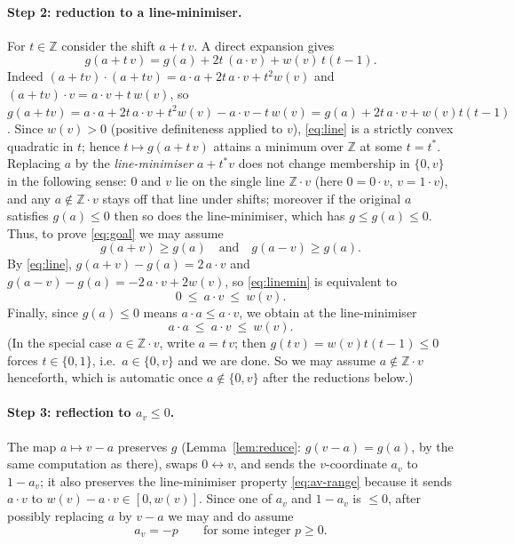 \documentclass[11pt]{article}
\newcommand{\bZ}{\mathbb{Z}}
\theoremstyle{definition}
\begin{document}
\paragraph{Step 2: reduction to a line-minimiser.}
For $t\in\bZ$ consider the shift $a+t\,v$. A direct expansion gives
\begin{equation}\label{eq:line}
g(a+t\,v)=g(a)+2t\,(a\cdot v)+w(v)\,t(t-1).
\end{equation}
Indeed $(a+tv)\cdot(a+tv)=a\cdot a+2t\,a\cdot v+t^2 w(v)$ and
$(a+tv)\cdot v=a\cdot v+t\,w(v)$, so
$g(a+tv)=a\cdot a+2t\,a\cdot v+t^2 w(v)-a\cdot v-t\,w(v)=g(a)+2t\,a\cdot v+w(v)t(t-1)$.
Since $w(v)>0$ (positive definiteness applied to $v$), \eqref{eq:line} is a strictly
convex quadratic in $t$; hence $t\mapsto g(a+t\,v)$ attains a minimum over $\bZ$ at some
$t=t^\ast$. Replacing $a$ by the \emph{line-minimiser} $a+t^\ast v$ does not change
membership in $\{0,v\}$ in the following sense: $0$ and $v$ lie on the single line
$\bZ\cdot v$ (here $0=0\cdot v$, $v=1\cdot v$), and any $a\notin\bZ\cdot v$ stays off that
line under shifts; moreover if the original $a$ satisfies $g(a)\le 0$ then so does the
line-minimiser, which has $g\le g(a)\le 0$. Thus, to prove \eqref{eq:goal} we may assume
\begin{equation}\label{eq:linemin}
g(a+v)\ge g(a)\quad\text{and}\quad g(a-v)\ge g(a).
\end{equation}
By \eqref{eq:line}, $g(a+v)-g(a)=2\,a\cdot v$ and $g(a-v)-g(a)=-2\,a\cdot v+2w(v)$, so
\eqref{eq:linemin} is equivalent to
\begin{equation}\label{eq:av-range}
0\ \le\ a\cdot v\ \le\ w(v).
\end{equation}
Finally, since $g(a)\le 0$ means $a\cdot a\le a\cdot v$, we obtain at the line-minimiser
\begin{equation}\label{eq:short}
a\cdot a\ \le\ a\cdot v\ \le\ w(v).
\end{equation}
(In the special case $a\in\bZ\cdot v$, write $a=t\,v$; then $g(t\,v)=w(v)t(t-1)\le 0$
forces $t\in\{0,1\}$, i.e.\ $a\in\{0,v\}$ and we are done. So we may assume
$a\notin\bZ\cdot v$ henceforth, which is automatic once $a\notin\{0,v\}$ after the
reductions below.)

\paragraph{Step 3: reflection to $a_v\le 0$.}
The map $a\mapsto v-a$ preserves $g$ (Lemma~\ref{lem:reduce}: $g(v-a)=g(a)$, by the same
computation as there), swaps $0\leftrightarrow v$, and sends the $v$-coordinate $a_v$ to
$1-a_v$; it also preserves the line-minimiser property \eqref{eq:av-range} because it
sends $a\cdot v$ to $w(v)-a\cdot v\in[0,w(v)]$. Since one of $a_v$ and $1-a_v$ is $\le 0$,
after possibly replacing $a$ by $v-a$ we may and do assume
\[
a_v=-p\qquad\text{for some integer }p\ge 0 .
\]
\end{document}
